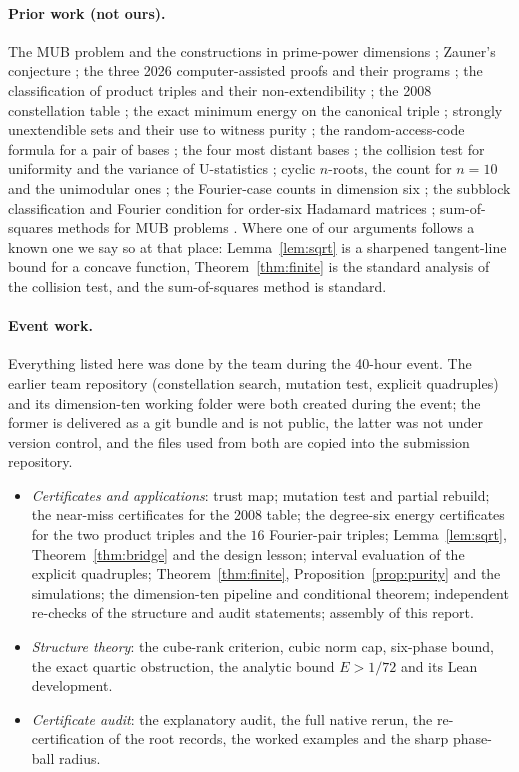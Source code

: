 \documentclass[11pt]{article}
\newcommand{\E}{E}                       %
\theoremstyle{definition}
\theoremstyle{remark}
\begin{document}
\paragraph{Prior work (not ours).} The MUB problem and the constructions in prime-power dimensions
\cite{Ivanovic81,WF,DEBZ}; Zauner's conjecture \cite{Zauner}; the three 2026 computer-assisted proofs and their
programs \cite{OAI,OAIF,Jaswal1,Jaswal2,CWT}; the classification of product triples and their non-extendibility
\cite{MW12,MWreview}; the 2008 constellation table \cite{BW08}; the exact minimum energy on the canonical triple
\cite{Erlwein}; strongly unextendible sets and their use to witness purity \cite{GMMP17}; the random-access-code
formula for a pair of bases \cite{ABMP}; the four most distant bases \cite{RLE}; the collision test for uniformity
and the variance of U-statistics \cite{GR00,Paninski08,Hoeffding48}; cyclic $n$-roots, the count for $n=10$ and
the unimodular ones \cite{BF91,FR15,Faugere02}; the Fourier-case counts in dimension six \cite{BF91,Grassl}; the
subblock classification and Fourier condition for order-six Hadamard matrices \cite{CWT}; sum-of-squares methods
for MUB problems \cite{BW10,GP24,Sarkar26}. Where one of our arguments follows a known one we say so at that place:
Lemma~\ref{lem:sqrt} is a sharpened tangent-line bound for a concave function, Theorem~\ref{thm:finite} is the
standard analysis of the collision test, and the sum-of-squares method is standard.

\paragraph{Event work.} Everything listed here was done by the team during the 40-hour event. The earlier team repository (constellation search, mutation
test, explicit quadruples) and its dimension-ten working folder were both created during the event; the former is
delivered as a git bundle and is not public, the latter was not under version control, and the files used from
both are copied into the submission repository.
\begin{itemize}
\item \emph{Certificates and applications}: trust map; mutation test and partial rebuild; the near-miss certificates for the 2008
table; the degree-six energy certificates for the two product triples and the $16$ Fourier-pair triples;
Lemma~\ref{lem:sqrt}, Theorem~\ref{thm:bridge} and the design lesson; interval evaluation of the explicit
quadruples; Theorem~\ref{thm:finite}, Proposition~\ref{prop:purity} and the simulations; the dimension-ten pipeline
and conditional theorem; independent re-checks of the structure and audit statements; assembly of this report.
\item \emph{Structure theory}: the cube-rank criterion, cubic norm cap, six-phase bound, the exact quartic
obstruction, the analytic bound $\E>1/72$ and its Lean development.
\item \emph{Certificate audit}: the explanatory audit, the full native rerun, the re-certification of the root
records, the worked examples and the sharp phase-ball radius.
\end{itemize}
\end{document}
